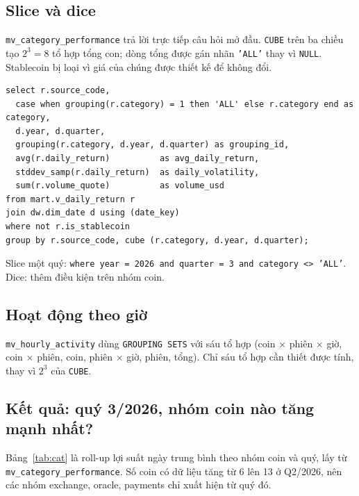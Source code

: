 \documentclass[11pt,a4paper]{article}
\newcommand{\code}[1]{\texttt{#1}}
\begin{document}
\subsection{Slice và dice}
\code{mv\_category\_performance} trả lời trực tiếp câu hỏi mở đầu. \code{CUBE} trên ba chiều tạo
$2^3 = 8$ tổ hợp tổng con; dòng tổng được gán nhãn \code{'ALL'} thay vì \code{NULL}. Stablecoin bị
loại vì giá của chúng được thiết kế để không đổi.

\begin{lstlisting}[language=psql]
select r.source_code,
  case when grouping(r.category) = 1 then 'ALL' else r.category end as category,
  d.year, d.quarter,
  grouping(r.category, d.year, d.quarter) as grouping_id,
  avg(r.daily_return)          as avg_daily_return,
  stddev_samp(r.daily_return)  as daily_volatility,
  sum(r.volume_quote)          as volume_usd
from mart.v_daily_return r
join dw.dim_date d using (date_key)
where not r.is_stablecoin
group by r.source_code, cube (r.category, d.year, d.quarter);
\end{lstlisting}

Slice một quý: \code{where year = 2026 and quarter = 3 and category <> 'ALL'}. Dice: thêm điều kiện
trên nhóm coin.

\subsection{Hoạt động theo giờ}
\code{mv\_hourly\_activity} dùng \code{GROUPING SETS} với sáu tổ hợp (coin $\times$ phiên $\times$ giờ,
coin $\times$ phiên, coin, phiên $\times$ giờ, phiên, tổng). Chỉ sáu tổ hợp cần thiết được tính,
thay vì $2^3$ của \code{CUBE}.

\subsection{Kết quả: quý 3/2026, nhóm coin nào tăng mạnh nhất?}
Bảng~\ref{tab:cat} là roll-up lợi suất ngày trung bình theo nhóm coin và quý, lấy từ
\code{mv\_category\_performance}. Số coin có dữ liệu tăng từ 6 lên 13 ở Q2/2026, nên các nhóm
exchange, oracle, payments chỉ xuất hiện từ quý đó.
\end{document}
